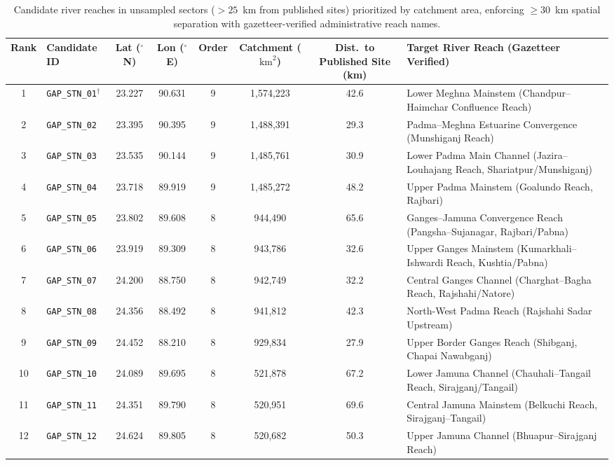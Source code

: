 \documentclass[authoryear,preprint,12pt]{elsarticle}
\begin{document}
\begin{table}[htbp]
\centering
\small
\caption{Candidate river reaches in unsampled sectors ($>25$~km from published sites) prioritized by catchment area, enforcing $\ge 30$~km spatial separation with gazetteer-verified administrative reach names.}
\label{tab:stations}
\begin{adjustbox}{width=\textwidth,center}
\begin{tabular}{clcccccl}
\toprule
Rank & Candidate ID & Lat ($^\circ$N) & Lon ($^\circ$E) & Order & Catchment ($\text{km}^2$) & Dist.\ to Published Site (km) & Target River Reach (Gazetteer Verified) \\
\midrule
1 & \texttt{GAP\_STN\_01}$^\dagger$ & 23.227 & 90.631 & 9 & 1,574,223 & 42.6 & Lower Meghna Mainstem (Chandpur--Haimchar Confluence Reach) \\
2 & \texttt{GAP\_STN\_02} & 23.395 & 90.395 & 9 & 1,488,391 & 29.3 & Padma--Meghna Estuarine Convergence (Munshiganj Reach) \\
3 & \texttt{GAP\_STN\_03} & 23.535 & 90.144 & 9 & 1,485,761 & 30.9 & Lower Padma Main Channel (Jazira--Louhajang Reach, Shariatpur/Munshiganj) \\
4 & \texttt{GAP\_STN\_04} & 23.718 & 89.919 & 9 & 1,485,272 & 48.2 & Upper Padma Mainstem (Goalundo Reach, Rajbari) \\
5 & \texttt{GAP\_STN\_05} & 23.802 & 89.608 & 8 & 944,490 & 65.6 & Ganges--Jamuna Convergence Reach (Pangsha--Sujanagar, Rajbari/Pabna) \\
6 & \texttt{GAP\_STN\_06} & 23.919 & 89.309 & 8 & 943,786 & 32.6 & Upper Ganges Mainstem (Kumarkhali--Ishwardi Reach, Kushtia/Pabna) \\
7 & \texttt{GAP\_STN\_07} & 24.200 & 88.750 & 8 & 942,749 & 32.2 & Central Ganges Channel (Charghat--Bagha Reach, Rajshahi/Natore) \\
8 & \texttt{GAP\_STN\_08} & 24.356 & 88.492 & 8 & 941,812 & 42.3 & North-West Padma Reach (Rajshahi Sadar Upstream) \\
9 & \texttt{GAP\_STN\_09} & 24.452 & 88.210 & 8 & 929,834 & 27.9 & Upper Border Ganges Reach (Shibganj, Chapai Nawabganj) \\
10 & \texttt{GAP\_STN\_10} & 24.089 & 89.695 & 8 & 521,878 & 67.2 & Lower Jamuna Channel (Chauhali--Tangail Reach, Sirajganj/Tangail) \\
11 & \texttt{GAP\_STN\_11} & 24.351 & 89.790 & 8 & 520,951 & 69.6 & Central Jamuna Mainstem (Belkuchi Reach, Sirajganj--Tangail) \\
12 & \texttt{GAP\_STN\_12} & 24.624 & 89.805 & 8 & 520,682 & 50.3 & Upper Jamuna Channel (Bhuapur--Sirajganj Reach) \\

\end{tabular}
\end{adjustbox}
\end{table}
\end{document}
